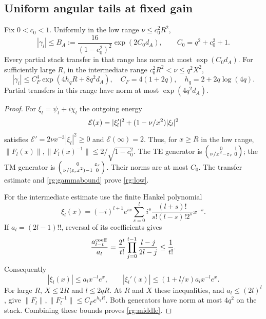 \subsection{Uniform angular tails at fixed gain}

\begin{lemma}\label{rg:lowmiddle}
Fix $0<c_0<1$. Uniformly in the low range $\nu\leq c_0^2R^2$,
\begin{equation}\label{rg:low}
 |\gamma_l|\leq B_A:=
 \frac{16}{(1-c_0^2)^2}\exp(2C_0d_A),\qquad
 C_0=q^2+c_0^2+1.
\end{equation}
Every partial stack transfer in that range has norm at most
$\exp(C_0d_A)$. For sufficiently large $R$, in the intermediate
range $c_0^2R^2<\nu\leq q^2X^2$,
\begin{equation}\label{rg:middle}
 |\gamma_l|\leq C_F^4\exp(4h_qR+8q^2d_A),\quad
 C_F=4(1+2q),\quad h_q=2+2q\log(4q).
\end{equation}
Partial transfers in this range have norm at most
$\exp(4q^2d_A)$.
\end{lemma}
\begin{proof}
For $\xi_l=\psi_l+i\chi_l$ the outgoing energy
\[
 {\cal E}(x)=|\xi_l'|^2+(1-\nu/x^2)|\xi_l|^2
\]
satisfies $\mathcal E'=2\nu x^{-3}|\xi_l|^2\geq0$ and
$\mathcal E(\infty)=2$. Thus, for $x\geq R$ in the low range,
$\|F_l(x)\|,\|F_l(x)^{-1}\|\leq2/\sqrt{1-c_0^2}$.
The TE generator is
$\left(\begin{smallmatrix}0&1\\\nu/x^2-\varepsilon_r&0\end{smallmatrix}\right)$;
the TM generator is
$\left(\begin{smallmatrix}0&\varepsilon_r\\
\nu/(\varepsilon_rx^2)-1&0\end{smallmatrix}\right)$.
Their norms are at most $C_0$. The transfer estimate and
\eqref{rg:gammabound} prove \eqref{rg:low}.

For the intermediate estimate use the finite Hankel polynomial
\[
 \xi_l(x)=(-i)^{l+1}e^{ix}
  \sum_{s=0}^l i^s\frac{(l+s)!}{s!(l-s)!2^s}x^{-s}.
\]
If $a_l=(2l-1)!!$, reversal of its coefficients gives
\[
 \frac{a_{l-t}^{\rm coeff}}{a_l}
 =\frac{2^t}{t!}\prod_{j=0}^{t-1}\frac{l-j}{2l-j}
 \leq\frac1{t!}.
\]
Consequently
\[
 |\xi_l(x)|\leq a_lx^{-l}e^x,\qquad
 |\xi_l'(x)|\leq(1+l/x)a_lx^{-l}e^x.
\]
For large $R$, $X\leq2R$ and $l\leq2qR$. At $R$ and $X$
these inequalities, and $a_l\leq(2l)^l$, give
$\|F_l\|,\|F_l^{-1}\|\leq C_Fe^{h_qR}$.
Both generators have norm at most $4q^2$ on the stack.
Combining these bounds proves \eqref{rg:middle}.
\end{proof}

